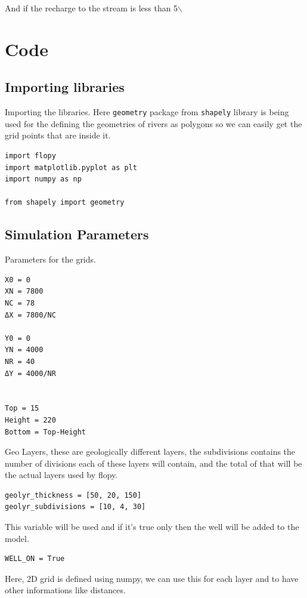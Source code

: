 \documentclass[titlepage,12pt]{unisubmission}
\begin{document}
And if the recharge to the stream is less than 5$\backslash$%

\section{Code}
\label{sec:orgf04b329}

\subsection{Importing libraries}
\label{sec:org9ec42e1}
Importing the libraries. Here \texttt{geometry} package from \texttt{shapely} library is being used for the defining the geometries of rivers as polygons so we can easily get the grid points that are inside it.

\begin{verbatim}
import flopy
import matplotlib.pyplot as plt
import numpy as np

from shapely import geometry
\end{verbatim}

\subsection{Simulation Parameters}
\label{sec:orgfca4e4f}
Parameters for the grids.
\begin{verbatim}
X0 = 0
XN = 7800
NC = 78
ΔX = 7800/NC

Y0 = 0
YN = 4000
NR = 40
ΔY = 4000/NR


Top = 15
Height = 220
Bottom = Top-Height
\end{verbatim}


Geo Layers, these are geologically different layers, the subdivisions contains the number of divisions each of these layers will contain, and the total of that will be the actual layers used by flopy.

\begin{verbatim}
geolyr_thickness = [50, 20, 150]
geolyr_subdivisions = [10, 4, 30]
\end{verbatim}

This variable will be used and if it's true only then the well will be added to the model.

\begin{verbatim}
WELL_ON = True
\end{verbatim}


Here, 2D grid is defined using numpy, we can use this for each layer and to have other informations like distances.
\end{document}
